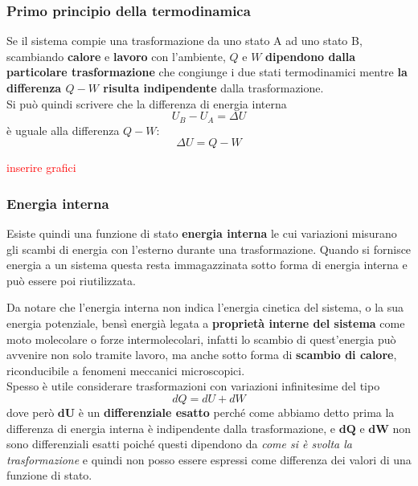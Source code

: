 \documentclass[x11names]{article}
\begin{document}
	
	\begin{center}
		\colorbox{yred}{\begin{minipage}{5.75in}
				\begin{redes}{}
					\subsubsection{Primo principio della termodinamica}
					Se il sistema compie una trasformazione da uno stato A ad uno stato B, scambiando \textbf{calore} e \textbf{lavoro} con l'ambiente, \(Q\) e \(W\) \textbf{dipendono dalla particolare trasformazione} che congiunge i due stati termodinamici mentre \textbf{la differenza \(Q-W\) risulta indipendente} dalla trasformazione.\\
					
					Si può quindi scrivere che la differenza di energia interna 
					\[ 
					U_B - U_A = \Delta U 
					\]
					è uguale alla differenza \(Q-W\):
					\begin{equation}\label{primoprincipio}
						\Delta U = Q -W
					\end{equation}
				\end{redes}
		\end{minipage}}
	\end{center}
	\begin{center}
		\textcolor{red}{inserire grafici}
	\end{center}
	
	\subsubsection{Energia interna}
	Esiste quindi una funzione di stato \textbf{energia interna} le cui variazioni misurano gli scambi di energia con l'esterno durante una trasformazione. Quando si fornisce energia a un sistema questa resta immagazzinata sotto forma di energia interna e può essere poi riutilizzata.
	
	Da notare che l'energia interna non indica l'energia cinetica del sistema, o la sua energia potenziale, bensì energià legata a \textbf{proprietà interne del sistema} come moto molecolare o forze intermolecolari, infatti lo scambio di quest'energia  può avvenire non solo tramite lavoro, ma anche sotto forma di \textbf{scambio di calore}, riconducibile a fenomeni meccanici microscopici.\\
	
	\noindent
	Spesso è utile considerare trasformazioni con variazioni infinitesime del tipo
	\[ 
	dQ = dU + dW
	\]
	dove però \(\boldsymbol{dU}\) è un \textbf{differenziale esatto} perché come abbiamo detto prima la differenza di energia interna è indipendente dalla trasformazione, e \(\boldsymbol{dQ}\) e \(\boldsymbol{dW}\) non sono differenziali esatti poiché questi dipendono da \textit{come si è svolta la trasformazione} e quindi non posso essere espressi come differenza dei valori di una funzione di stato.
	
\end{document}

